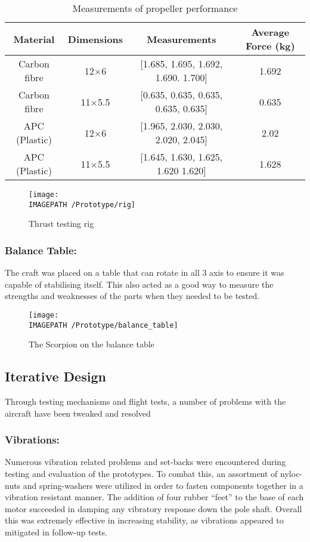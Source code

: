 \begin{table}[htbp]
	\centering
	\begin{tabular}{|c|c|c|c|}
		\hline Material & Dimensions & Measurements & Average Force (kg) \\ 
		\hline Carbon fibre & 12$\times$6 & [1.685, 1.695, 1.692, 1.690. 1.700] & 1.692 \\ 
		\hline Carbon fibre & 11$\times$5.5 & [0.635, 0.635, 0.635, 0.635, 0.635] & 0.635 \\ 
		\hline APC (Plastic) & 12$\times$6 & [1.965, 2.030, 2.030, 2.020, 2.045] & 2.02 \\ 
		\hline APC (Plastic) & 11$\times$5.5 & [1.645, 1.630, 1.625, 1.620 1.620] & 1.628 \\ 
		\hline 
	\end{tabular} 
	\caption{Measurements of propeller performance}
	\label{tab:props}
\end{table}

\begin{figure}[!ht]
	\centering
	\texttt{[image: \\IMAGEPATH /Prototype/rig]}
	\caption{Thrust testing rig}
	\label{fig:rig}
\end{figure}



\subsubsection*{Balance Table:} The craft was placed on a table that can rotate in all 3 axis to ensure it was capable of stabilising itself. This also acted as a good way to measure the strengths and weaknesses of the parts when they needed to be tested. 

\begin{figure}[!ht]
	\centering
	\texttt{[image: \\IMAGEPATH /Prototype/balance\_table]}
	\caption{The Scorpion on the balance table}
	\label{fig:balance_table}
\end{figure}


\subsection{Iterative Design}
Through testing mechanisms and flight tests, a number of problems with the aircraft have been tweaked and resolved

\subsubsection*{Vibrations:} Numerous vibration related problems and set-backs were encountered during testing and evaluation of the prototypes. To combat this, an assortment of nyloc-nuts and spring-washers were utilized in order to fasten components together in a vibration resistant manner. The addition of four rubber ``feet'' to the base of each motor succeeded in damping any vibratory response down the pole shaft. Overall this was extremely effective in increasing stability, as vibrations appeared to mitigated in follow-up tests.

